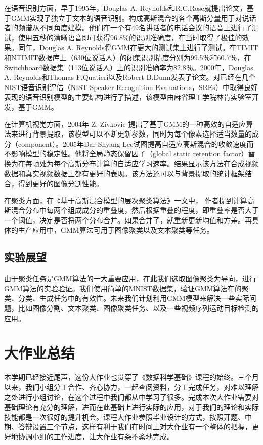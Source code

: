 \documentclass[UTF8]{ctexart}
\begin{document}
在语音识别方面，早于1995年，Douglas A. Reynolds和R.C.Rose就提出论文，基于GMM实现了独立于文本的语音识别。构成高斯混合的各个高斯分量用于对说话者的频谱从不同角度建模。他们在一个有49名讲话者的电话会议的语音上进行了测试，使用五秒的清晰语音即可获得96.8\%的识别准确度，在当时取得了极佳的效果。同年，Douglas A. Reynolds将GMM在更大的测试集上进行了测试。在TIMIT和NTIMIT数据库上（630位说话人）的闭集识别精度分别为99.5％和60.7％，在Switchboard数据集（113位说话人）上的识别准确率为82.8％。2000年，Douglas A. Reynolds和Thomas F.Quatieri以及Robert B.Dunn发表了论文。对已经在几个NIST语音识别评估（NIST Speaker Recognition Evaluations，SREs）中取得良好表现的语音识别模型的主要结构进行了描述，该模型由麻省理工学院林肯实验室开发，基于GMM。

在计算机视觉方面，2004年 Z. Zivkovic 提出了基于GMM的一种高效的自适应算法来进行背景提取，该模型可以不断更新参数，同时为每个像素选择适当数量的成分（component）。2005年Dar-Shyang Lee试图提高自适应高斯混合的收敛速度而不影响模型的稳定性。他将全局静态保留因子（global static retention factor）替换为在每帧处为每个高斯分布计算的自适应学习速率。结果显示该方法在合成视频数据和真实视频数据上都有更好的表现。该方法还可以与背景提取的统计框架结合，得到更好的图像分割性能。

在聚类方面，在《基于高斯混合模型的层次聚类算法》一文中， 作者提到计算高斯混合分布中每两个组成成分的重叠度，然后根据重叠的程度，即重叠率是否大于一个阈值，决定是否将两个分布合并。如果合并了，就重新更新均值和方差。再具体的生产应用中，GMM算法可用于图像聚类以及文本聚类等任务。

\subsection{实验展望}

由于聚类任务是GMM算法的一大重要应用，在此我们选取图像聚类为导向，进行GMM算法的实验验证。我们使用简单的MNIST数据集，验证GMM算法在的聚类、分类、生成任务中的有效性。未来我们计划利用GMM模型来解决一些实际问题，比如图像分割、文本聚类、图像聚类任务、以及一些视频序列运动目标检测的应用。

\section{大作业总结}

本学期已经接近尾声，这份大作业也贯穿了《数据科学基础》课程的始终。三个月以来，我们小组分工合作、齐心协力，一起查阅资料，分工完成任务，对难以理解之处进行小组讨论，在这个过程中我们都从中学习了很多。完成本次大作业需要对基础理论有充分的理解，进而在此基础上进行实际的应用，对于我们的理论和实际技能都是一次很好的提升机会。课程大作业参照毕业设计的方式，按照开题、中期、答辩设置三个节点，这样有利于我们在时间上对大作业有一个整体的把握，更好地协调小组的工作进度，让大作业有条不紊地完成。
\end{document}
